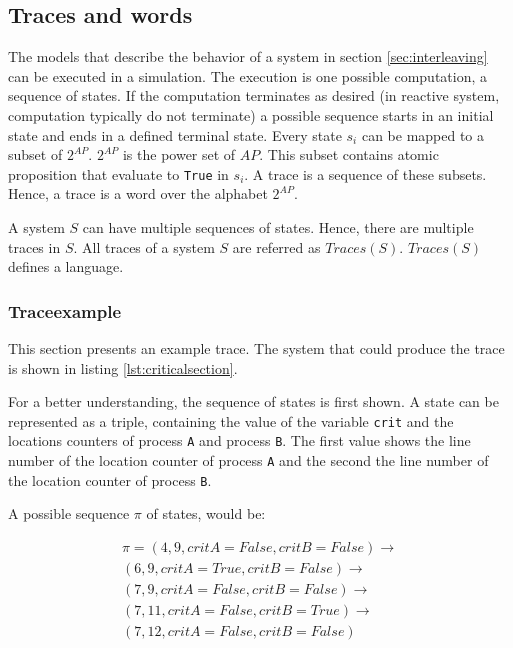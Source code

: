 \documentclass[12pt,a4paper,twoside]{article}
\begin{document}
\subsection{Traces and words}
\label{sec:traces}

The models that describe the behavior of a system in section \ref{sec:interleaving} can be executed in a simulation. The execution is one possible computation, a sequence of states. If the computation terminates as desired (in reactive system, computation typically do not terminate) a possible sequence starts in an initial state and ends in a defined terminal state. Every state $s_i$ can be mapped to a subset of $2^{AP}$. $2^{AP}$ is the power set of $AP$. This subset contains atomic proposition that evaluate to \verb|True| in $s_i$. A trace is a sequence of these subsets. Hence, a trace is a word over the alphabet $2^{AP}$.

A system $S$ can have multiple sequences of states. Hence, there are multiple traces in $S$. All traces of a system $S$ are referred as $Traces(S)$. $Traces(S)$ defines a language.

\subsubsection{Traceexample}
\label{sec:traceexample}

This section presents an example trace. The system that could produce the trace is shown in listing \ref{lst:criticalsection}.



For a better understanding, the sequence of states is first shown. A state can be represented as a triple, containing the value of the variable \verb|crit| and the locations counters of process \verb|A| and process \verb|B|. The first value shows the line number of the location counter of process \verb|A| and the second the line number of the location counter of process \verb|B|.

A possible sequence $\pi$ of states, would be:

\begin{equation}
  \label{eq:path}
  \begin{split}
\pi = (4, 9, {critA}={False},{critB}=False) \rightarrow \\
(6, 9, {critA}={True},{critB}=False) \rightarrow \\
(7, 9, {critA}={False},{critB}=False) \rightarrow \\
(7, 11, {critA}={False},{critB}=True) \rightarrow \\
(7, 12, {critA}={False},{critB}=False)
  \end{split}
\end{equation}
\end{document}
